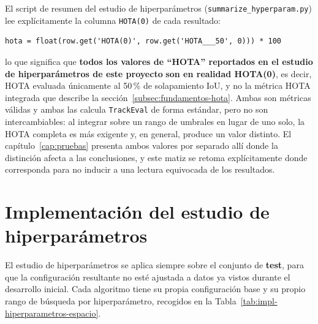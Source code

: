 El script de resumen del estudio de hiperparámetros
(\texttt{summarize\_hyperparam.py}) lee explícitamente la columna
\texttt{HOTA(0)} de cada resultado:

\begin{center}
\begin{minipage}{0.8\textwidth}
\begin{verbatim}
hota = float(row.get('HOTA(0)', row.get('HOTA___50', 0))) * 100
\end{verbatim}
\end{minipage}
\end{center}

lo que significa que \textbf{todos los valores de ``HOTA'' reportados en
el estudio de hiperparámetros de este proyecto}
\textbf{son en realidad HOTA(0)}, es decir, HOTA evaluada únicamente al
50\,\% de solapamiento IoU, y no la métrica HOTA integrada que
describe la sección~\ref{subsec:fundamentos-hota}. Ambas son métricas
válidas y ambas las calcula \texttt{TrackEval} de forma estándar, pero no
son intercambiables: al integrar sobre un rango de umbrales en lugar de
uno solo, la HOTA completa es más exigente y, en general, produce un valor
distinto.
El capítulo~\ref{cap:pruebas} presenta ambos valores por separado allí
donde la distinción afecta a las conclusiones, y este matiz se retoma
explícitamente donde corresponda para no inducir a una lectura equivocada
de los resultados.

\section{Implementación del estudio de hiperparámetros}
\label{sec:implementacion-hiperparametros}

El estudio de hiperparámetros se aplica siempre sobre el
conjunto de \textbf{test}, para que la
configuración resultante no esté ajustada a datos ya vistos durante el
desarrollo inicial. Cada algoritmo tiene su propia configuración base y su
propio rango de búsqueda por hiperparámetro, recogidos en la
Tabla~\ref{tab:impl-hiperparametros-espacio}.

